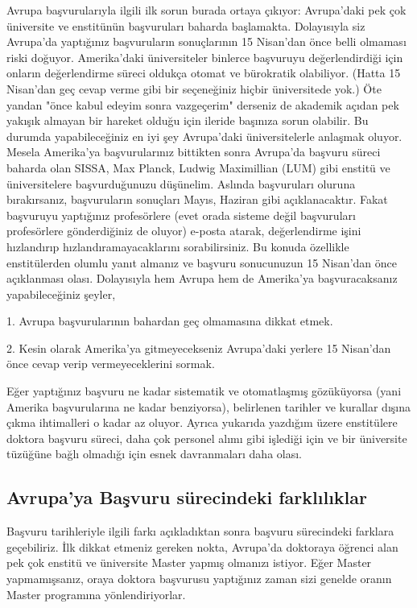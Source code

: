 \documentclass[12pt]{article}
\begin{document}
Avrupa başvurularıyla ilgili ilk sorun burada ortaya çıkıyor: Avrupa'daki pek çok üniversite ve enstitünün başvuruları baharda başlamakta. Dolayısıyla siz Avrupa'da yaptığınız başvuruların sonuçlarının 15 Nisan'dan önce belli olmaması riski doğuyor. Amerika'daki üniversiteler binlerce başvuruyu değerlendirdiği için onların değerlendirme süreci oldukça otomat ve bürokratik olabiliyor. (Hatta 15 Nisan'dan geç cevap verme gibi bir seçeneğiniz hiçbir üniversitede yok.) Öte yandan "önce kabul edeyim sonra vazgeçerim" derseniz de akademik açıdan pek yakışık almayan bir hareket olduğu için ileride başınıza sorun olabilir. Bu durumda yapabileceğiniz en iyi şey Avrupa'daki üniversitelerle anlaşmak oluyor. Mesela Amerika'ya başvurularınız bittikten sonra Avrupa'da başvuru süreci baharda olan SISSA, Max Planck, Ludwig Maximillian (LUM) gibi enstitü ve üniversitelere başvurduğunuzu düşünelim. Aslında başvuruları oluruna bırakırsanız, başvuruların sonuçları Mayıs, Haziran gibi açıklanacaktır. Fakat başvuruyu yaptığınız profesörlere (evet orada sisteme değil başvuruları profesörlere gönderdiğiniz de oluyor) e-posta atarak, değerlendirme işini hızlandırıp hızlandıramayacaklarını sorabilirsiniz. Bu konuda özellikle enstitülerden olumlu yanıt almanız ve başvuru sonucunuzun 15 Nisan’dan önce açıklanması olası. Dolayısıyla hem Avrupa hem de Amerika’ya başvuracaksanız yapabileceğiniz şeyler, 

1. Avrupa başvurularının bahardan geç olmamasına dikkat etmek. 

2. Kesin olarak Amerika'ya gitmeyecekseniz Avrupa'daki yerlere 15 Nisan’dan önce cevap verip vermeyeceklerini sormak. 

Eğer yaptığınız başvuru ne kadar sistematik ve otomatlaşmış gözüküyorsa (yani Amerika başvurularına ne kadar benziyorsa), belirlenen tarihler ve kurallar dışına çıkma ihtimalleri o kadar az oluyor. Ayrıca yukarıda yazdığım üzere enstitülere doktora başvuru süreci, daha çok personel alımı gibi işlediği için ve bir üniversite tüzüğüne bağlı olmadığı için esnek davranmaları daha olası. 

\subsection{Avrupa'ya Başvuru sürecindeki farklılıklar}

Başvuru tarihleriyle ilgili farkı açıkladıktan sonra başvuru sürecindeki farklara geçebiliriz. İlk dikkat etmeniz gereken nokta, Avrupa'da doktoraya öğrenci alan pek çok enstitü ve üniversite Master yapmış olmanızı istiyor. Eğer Master yapmamışsanız, oraya doktora başvurusu yaptığınız zaman sizi genelde oranın Master programına yönlendiriyorlar. 
\end{document}

